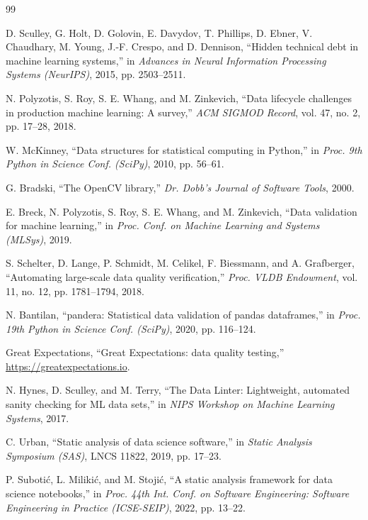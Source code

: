 \documentclass[conference]{IEEEtran}
\begin{document}
\begin{thebibliography}{99}

D. Sculley, G. Holt, D. Golovin, E. Davydov, T. Phillips, D. Ebner, V. Chaudhary, M. Young, J.-F.
Crespo, and D. Dennison, ``Hidden technical debt in machine learning systems,'' in \emph{Advances
in Neural Information Processing Systems (NeurIPS)}, 2015, pp. 2503--2511.

N. Polyzotis, S. Roy, S. E. Whang, and M. Zinkevich, ``Data lifecycle challenges in production
machine learning: A survey,'' \emph{ACM SIGMOD Record}, vol. 47, no. 2, pp. 17--28, 2018.

W. McKinney, ``Data structures for statistical computing in Python,'' in \emph{Proc. 9th Python in
Science Conf. (SciPy)}, 2010, pp. 56--61.

G. Bradski, ``The OpenCV library,'' \emph{Dr. Dobb's Journal of Software Tools}, 2000.

E. Breck, N. Polyzotis, S. Roy, S. E. Whang, and M. Zinkevich, ``Data validation for machine
learning,'' in \emph{Proc. Conf. on Machine Learning and Systems (MLSys)}, 2019.

S. Schelter, D. Lange, P. Schmidt, M. Celikel, F. Biessmann, and A. Grafberger, ``Automating
large-scale data quality verification,'' \emph{Proc. VLDB Endowment}, vol. 11, no. 12,
pp. 1781--1794, 2018.

N. Bantilan, ``pandera: Statistical data validation of pandas dataframes,'' in \emph{Proc. 19th
Python in Science Conf. (SciPy)}, 2020, pp. 116--124.

Great Expectations, ``Great Expectations: data quality testing,'' \url{https://greatexpectations.io}.

N. Hynes, D. Sculley, and M. Terry, ``The Data Linter: Lightweight, automated sanity checking for
ML data sets,'' in \emph{NIPS Workshop on Machine Learning Systems}, 2017.

C. Urban, ``Static analysis of data science software,'' in \emph{Static Analysis Symposium (SAS)},
LNCS 11822, 2019, pp. 17--23.

P. Suboti\'{c}, L. Miliki\'{c}, and M. Stoji\'{c}, ``A static analysis framework for data science
notebooks,'' in \emph{Proc. 44th Int. Conf. on Software Engineering: Software Engineering in
Practice (ICSE-SEIP)}, 2022, pp. 13--22.


\end{thebibliography}
\end{document}
